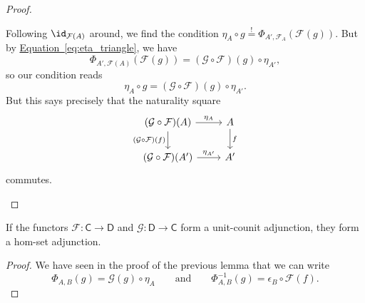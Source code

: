 \documentclass[main.tex]{subfiles}
\begin{document}
\begin{proof}
\begin{enumerate}
      Following $\id_{\mathcal{F}(A)}$ around, we find the condition $\eta_{A} \circ g \overset{!}{=} \Phi_{A', \mathcal{F}_{A}}(\mathcal{F}(g))$. But by \hyperref[eq:eta_triangle]{Equation~\ref*{eq:eta_triangle}}, we have
      \begin{equation*}
        \Phi_{A', \mathcal{F}(A)}(\mathcal{F}(g)) = (\mathcal{G} \circ \mathcal{F})(g) \circ \eta_{A'},
      \end{equation*}
      so our condition reads
      \begin{equation*}
        \eta_{A} \circ g = (\mathcal{G} \circ \mathcal{F})(g) \circ \eta_{A'}.
      \end{equation*}
      But this says precisely that the naturality square
      \begin{equation*}
        \begin{tikzcd}
          (\mathcal{G} \circ \mathcal{F})(A)
          \arrow[r, "\eta_{A}"]
          \arrow[d, swap, "(\mathcal{G} \circ \mathcal{F})(f)"]
          & A
          \arrow[d, "f"]
          \\
          (\mathcal{G} \circ \mathcal{F})(A')
          \arrow[r, "\eta_{A'}"]
          & A'
        \end{tikzcd}
      \end{equation*}
      commutes.

  \end{enumerate}
\end{proof}

\begin{lemma}
  \label{lemma:unit-counit_adjunction_implies_hom-set_adjunction}
  If the functors $\mathcal{F}\colon \mathsf{C} \to \mathsf{D}$ and $\mathcal{G}\colon \mathsf{D} \to \mathsf{C}$ form a unit-counit adjunction, they form a hom-set  adjunction.
\end{lemma}
\begin{proof}
  We have seen in the proof of the previous lemma that we can write
  \begin{equation*}
    \Phi_{A, B}(g) = \mathcal{G}(g) \circ \eta_{A}\qquad\text{and}\qquad \Phi^{-1}_{A,B}(g) = \epsilon_{B} \circ \mathcal{F}(f).
  \end{equation*}
\end{proof}
\end{document}
